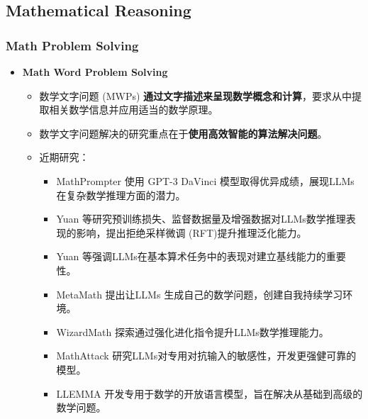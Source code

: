\subsection{Mathematical Reasoning}
\begin{frame}
	\frametitle{Math Problem Solving}
	\begin{itemize}
		\item \textbf{Math Word Problem Solving}
		      \begin{itemize}
			      \item 数学文字问题 (MWPs) \textbf{通过文字描述来呈现数学概念和计算}，要求从中提取相关数学信息并应用适当的数学原理。
			      \item 数学文字问题解决的研究重点在于\textbf{使用高效智能的算法解决问题}。
			      \item 近期研究：
			            \begin{itemize}
				            \item MathPrompter 使用 GPT-3 DaVinci 模型取得优异成绩，展现LLMs在复杂数学推理方面的潜力。
				            \item Yuan 等研究预训练损失、监督数据量及增强数据对LLMs数学推理表现的影响，提出拒绝采样微调 (RFT)提升推理泛化能力。
				            \item Yuan 等强调LLMs在基本算术任务中的表现对建立基线能力的重要性。
				            \item MetaMath 提出让LLMs 生成自己的数学问题，创建自我持续学习环境。
				            \item WizardMath 探索通过强化进化指令提升LLMs数学推理能力。
				            \item MathAttack 研究LLMs对专用对抗输入的敏感性，开发更强健可靠的模型。
				            \item LLEMMA 开发专用于数学的开放语言模型，旨在解决从基础到高级的数学问题。
			            \end{itemize}
		      \end{itemize}
	\end{itemize}
\end{frame}